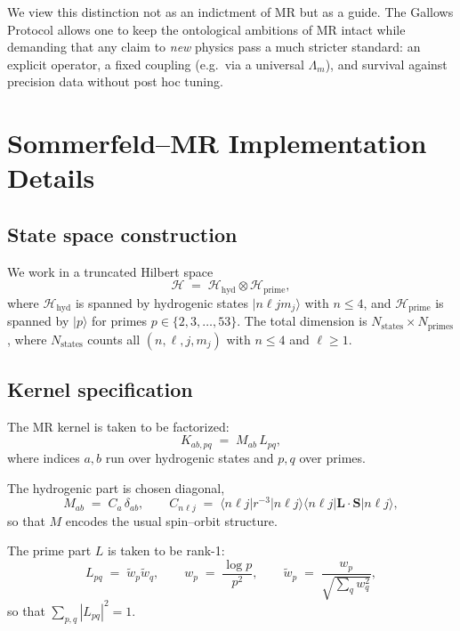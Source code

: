\documentclass[11pt,a4paper]{article}
\begin{document}
We view this distinction not as an indictment of MR but as a guide. The
Gallows Protocol allows one to keep the ontological ambitions of MR
intact while demanding that any claim to \emph{new} physics pass a much
stricter standard: an explicit operator, a fixed coupling (e.g.\ via a
universal $\Lambda_m$), and survival against precision data without
post hoc tuning.



\appendix

\section{Sommerfeld--MR Implementation Details}
\label{app:hydrogen}

\subsection{State space construction}
We work in a truncated Hilbert space
\begin{equation}
  \mathcal{H} \;=\; \mathcal{H}_{\text{hyd}} \otimes \mathcal{H}_{\text{prime}},
\end{equation}
where $\mathcal{H}_{\text{hyd}}$ is spanned by hydrogenic states
$\lvert n\ell j m_j \rangle$ with $n \le 4$, and
$\mathcal{H}_{\text{prime}}$ is spanned by $\lvert p\rangle$ for
primes $p \in \{2,3,\dots,53\}$.
The total dimension is
$N_{\text{states}} \times N_{\text{primes}}$, where $N_{\text{states}}$
counts all $(n,\ell,j,m_j)$ with $n\le4$ and $\ell\ge1$.

\subsection{Kernel specification}
The MR kernel is taken to be factorized:
\begin{equation}
  K_{ab,pq} \;=\; M_{ab} \, L_{pq},
\end{equation}
where indices $a,b$ run over hydrogenic states and $p,q$ over primes.

The hydrogenic part is chosen diagonal,
\begin{equation}
  M_{ab} \;=\; C_a \,\delta_{ab}, \qquad
  C_{n\ell j} \;=\; \big\langle n\ell j \big| r^{-3} \big| n\ell j \big\rangle
                    \big\langle n\ell j \big| \mathbf{L}\cdot\mathbf{S}
                    \big| n\ell j \big\rangle,
\end{equation}
so that $M$ encodes the usual spin--orbit structure.

The prime part $L$ is taken to be rank-1:
\begin{equation}
  L_{pq} \;=\; \tilde{w}_p \tilde{w}_q, \qquad
  w_p \;=\; \frac{\log p}{p^2}, \qquad
  \tilde{w}_p \;=\; \frac{w_p}{\sqrt{\sum_{q} w_q^2}},
\end{equation}
so that $\sum_{p,q} |L_{pq}|^2 = 1$.
\end{document}
